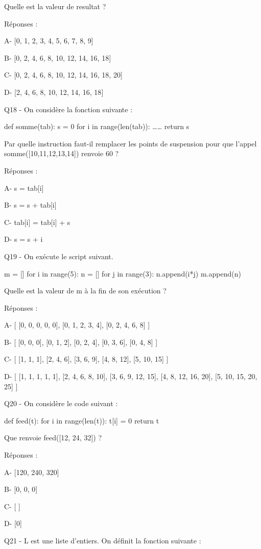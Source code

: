 \documentclass[
]{book}
\begin{document}
Quelle est la valeur de resultat ?

Réponses :

A- {[}0, 1, 2, 3, 4, 5, 6, 7, 8, 9{]}

B- {[}0, 2, 4, 6, 8, 10, 12, 14, 16, 18{]}

C- {[}0, 2, 4, 6, 8, 10, 12, 14, 16, 18, 20{]}

D- {[}2, 4, 6, 8, 10, 12, 14, 16, 18{]}

Q18 - On considère la fonction suivante :

def somme(tab):
s = 0
for i in range(len(tab)):
\ldots\ldots{}
return s

Par quelle instruction faut-il remplacer les points de suspension pour que l'appel somme({[}10,11,12,13,14{]}) renvoie 60 ?

Réponses :

A- s = tab{[}i{]}

B- s = s + tab{[}i{]}

C- tab{[}i{]} = tab{[}i{]} + s

D- s = s + i

Q19 - On exécute le script suivant.

m = {[}{]}
for i in range(5):
n = {[}{]}
for j in range(3):
n.append(i*j)
m.append(n)

Quelle est la valeur de m à la fin de son exécution ?

Réponses :

A- {[} {[}0, 0, 0, 0, 0{]}, {[}0, 1, 2, 3, 4{]}, {[}0, 2, 4, 6, 8{]} {]}

B- {[} {[}0, 0, 0{]}, {[}0, 1, 2{]}, {[}0, 2, 4{]}, {[}0, 3, 6{]}, {[}0, 4, 8{]} {]}

C- {[} {[}1, 1, 1{]}, {[}2, 4, 6{]}, {[}3, 6, 9{]}, {[}4, 8, 12{]}, {[}5, 10, 15{]} {]}

D- {[} {[}1, 1, 1, 1, 1{]}, {[}2, 4, 6, 8, 10{]}, {[}3, 6, 9, 12, 15{]}, {[}4, 8, 12, 16, 20{]}, {[}5, 10, 15, 20, 25{]} {]}

Q20 - On considère le code suivant :

def feed(t):
for i in range(len(t)):
t{[}i{]} = 0
return t

Que renvoie feed({[}12, 24, 32{]}) ?

Réponses :

A- {[}120, 240, 320{]}

B- {[}0, 0, 0{]}

C- {[} {]}

D- {[}0{]}

Q21 - L est une liste d'entiers. On définit la fonction suivante :
\end{document}

